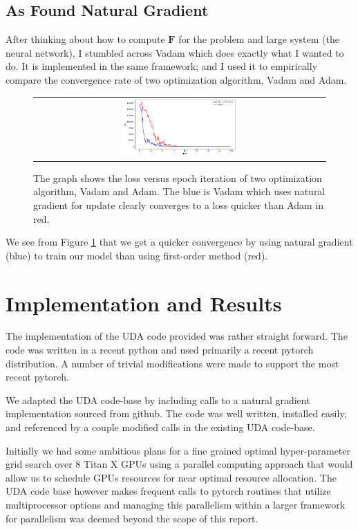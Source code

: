 \documentclass[10pt,twocolumn,letterpaper]{article}
\newcommand{\vect}[1]{\boldsymbol{\mathbf{#1}}}
\begin{document}
\subsection{As Found Natural Gradient}
After thinking about how to compute \(\vect{F}\) for the problem and large system (the neural network), I stumbled across Vadam \cite{khan2018fast} which does exactly what I wanted to do. 
It is implemented in the same framework; and I used it to empirically compare the convergence rate of two optimization algorithm, Vadam and Adam.
\begin{figure}[h]
\begin{tabular}{c}
     \includegraphics[width=0.4\textwidth]{images/vadam_compare.png}
\end{tabular}
\caption{The graph shows the loss versus epoch iteration of two optimization algorithm, Vadam and Adam. The blue is Vadam which uses natural gradient for update clearly converges to a loss quicker than Adam in red.}
    \label{fig:vadam_compare}
\end{figure}

We see from Figure \ref{fig:vadam_compare} that we get a quicker convergence by using natural gradient (blue) to train our model than using first-order method (red).

\section{Implementation and Results}
The implementation of the UDA code provided was rather straight forward.  The code was written in a recent python and used primarily a recent pytorch distribution.  A number of trivial modifications were made to support the most recent pytorch.

We adapted the UDA code-base by including calls to a natural gradient implementation sourced from github.  The code was well written, installed easily, and referenced by a couple modified calls in the existing UDA code-base. 

Initially we had some ambitious plans for a fine grained optimal hyper-parameter grid search over 8 Titan X GPUs using a parallel computing approach that would allow us to schedule GPUs resources for near optimal resource allocation. The UDA code base however makes frequent calls to pytorch routines that utilize multiprocessor options and managing this parallelism within a larger framework for parallelism was deemed beyond the scope of this report.  
\end{document}

